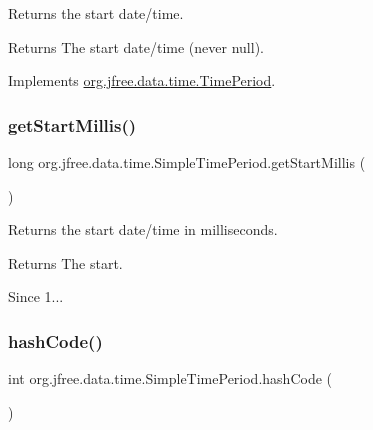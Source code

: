 Returns the start date/time.

\begin{DoxyReturn}{Returns}
The start date/time (never {\ttfamily null}). 
\end{DoxyReturn}


Implements \mbox{\hyperlink{interfaceorg_1_1jfree_1_1data_1_1time_1_1_time_period_aa8f08870c3b6b95ee24064383521e72e}{org.\+jfree.\+data.\+time.\+Time\+Period}}.

\mbox{\label{classorg_1_1jfree_1_1data_1_1time_1_1_simple_time_period_a9ead4c8717504b46e185666e8165a45e}} 
\subsubsection{\texorpdfstring{get\+Start\+Millis()}{getStartMillis()}}
{\footnotesize\ttfamily long org.\+jfree.\+data.\+time.\+Simple\+Time\+Period.\+get\+Start\+Millis (\begin{DoxyParamCaption}{ }\end{DoxyParamCaption})}

Returns the start date/time in milliseconds.

\begin{DoxyReturn}{Returns}
The start.
\end{DoxyReturn}
\begin{DoxySince}{Since}
1... 
\end{DoxySince}
\mbox{\label{classorg_1_1jfree_1_1data_1_1time_1_1_simple_time_period_ad47c7e4b3f685ee75b8e7dfa67ccda60}} 
\subsubsection{\texorpdfstring{hash\+Code()}{hashCode()}}
{\footnotesize\ttfamily int org.\+jfree.\+data.\+time.\+Simple\+Time\+Period.\+hash\+Code (\begin{DoxyParamCaption}{ }\end{DoxyParamCaption})}

